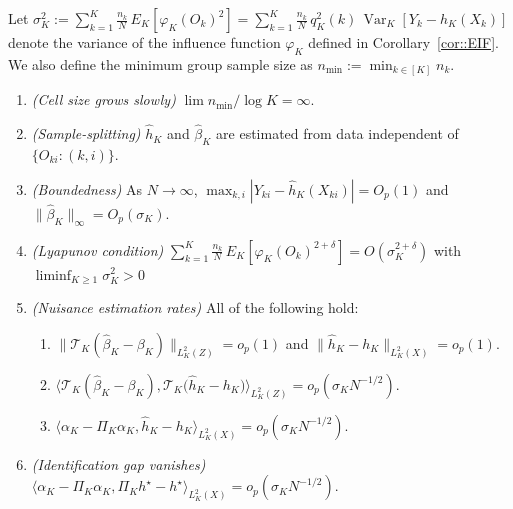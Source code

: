 \documentclass[11pt]{article}
\theoremstyle{plain}
\theoremstyle{definition}
\theoremstyle{remark}
\theoremstyle{definition}
\begin{document}
Let \(\sigma_K^2 := \sum_{k=1}^K \frac{n_k}{N} \, E_K\left[\varphi_K(O_k)^2\right] = \sum_{k=1}^K \frac{n_k}{N} \, q_K^2(k) \, \operatorname{Var}_K[Y_k - h_K(X_k)]\) denote the variance of the influence function \(\varphi_K\) defined in Corollary~\ref{cor::EIF}. We also define the minimum group sample size as \(n_{\min} := \min_{k \in [K]} n_k\).



\begin{enumerate}[label=\bf{D\arabic*)}, ref={D\arabic*}, series=cond2]
      \item \label{cond::grow}  \textit{(Cell size grows slowly)} $\lim n_{\min} / \log K = \infty$. %
    \item \textit{(Sample-splitting)} \label{cond::split} $\widehat{h}_K$ and $\widehat{\beta}_K$ are estimated from data independent of $\{O_{ki}: (k,i)\}$.
    \item \textit{(Boundedness)} 
          As $N \rightarrow \infty$,  $ \max_{k,i} |Y_{ki} - \widehat{h}_K(X_{ki})|= O_p(1)$ and $\|\widehat{\beta}_K\|_{\infty} = O_p(\sigma_K)$. \label{cond::bound}
    \item  \textit{(Lyapunov condition)} $\sum_{k=1}^K \frac{n_k}{N} \, E_K\left[\varphi_K(O_k)^{2 + \delta} \right]   = O(\sigma_K^{2 + \delta})$  with $\liminf_{K \geq 1} \sigma_K^2 > 0$ \label{cond::lyaponov}
    \item \label{cond::nuisrate} \textit{(Nuisance estimation rates)} All of the following hold:
    \begin{enumerate}[label={(\roman*)}, ref={\ref{cond::nuisrate}(\roman*)}]
        \item $\| \mathcal{T}_{K}( \widehat{\beta}_K - \beta_{K}) \|_{L^2_K(Z)} = o_p(1)$ and $\|  \widehat{h}_K - h_K\|_{L^2_K(X)} = o_p(1)$. \label{cond::consistency}
        \item   \(\big \langle \mathcal{T}_{K}( \widehat{\beta}_K - \beta_{K}) , \mathcal{T}_{K} \big( \widehat{h}_K - h_K \big) \big \rangle_{L^2_K(Z)}  = o_p(\sigma_K N^{-1/2})\). \label{cond::nuisrates}
        \item \label{cond::nuisrates2} \(\big\langle \alpha_K -  \Pi_{K} \alpha_K, \widehat{h}_K  -  h_K  \big\rangle_{L^2_K(X)} = o_p(\sigma_K N^{-1/2})\).
    \end{enumerate}
    \item \textit{(Identification gap vanishes)}  $\langle \alpha_K - \Pi_{K} \alpha_K, \Pi_{K} h^\star - h^\star \rangle_{L^2_K(X)} = o_p(\sigma_K N^{-1/2})$. \label{cond::approxrate}
\end{enumerate}
 
\end{document}
